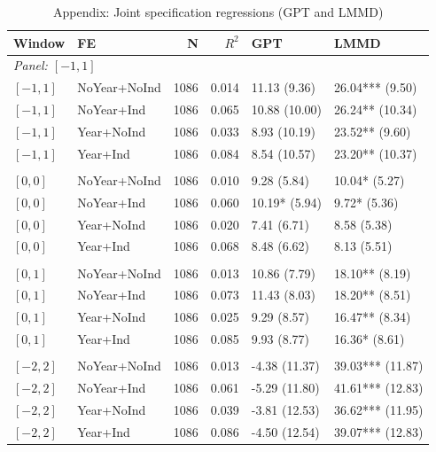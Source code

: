 \begin{table}[p]
\centering
\caption{Appendix: Joint specification regressions (GPT and LMMD)}
\label{tab:app_joint_spec}
\scriptsize
\setlength{\tabcolsep}{4pt}
\renewcommand{\arraystretch}{1.1}
\begin{tabular}{l l r r l l}
\toprule
Window & FE & N & $R^{2}$ & GPT & LMMD \\
\midrule
\multicolumn{6}{l}{\textit{Panel: $[-1,1]$}} \\
\addlinespace[1pt]
$[-1,1]$ & NoYear+NoInd & 1086 & 0.014 & 11.13 (9.36) & 26.04*** (9.50) \\
$[-1,1]$ & NoYear+Ind & 1086 & 0.065 & 10.88 (10.00) & 26.24** (10.34) \\
$[-1,1]$ & Year+NoInd & 1086 & 0.033 & 8.93 (10.19) & 23.52** (9.60) \\
$[-1,1]$ & Year+Ind & 1086 & 0.084 & 8.54 (10.57) & 23.20** (10.37) \\
\addlinespace[2pt]
\multicolumn{6}{l}{\textit{Panel: $[0,0]$}} \\
\addlinespace[1pt]
$[0,0]$ & NoYear+NoInd & 1086 & 0.010 & 9.28 (5.84) & 10.04* (5.27) \\
$[0,0]$ & NoYear+Ind & 1086 & 0.060 & 10.19* (5.94) & 9.72* (5.36) \\
$[0,0]$ & Year+NoInd & 1086 & 0.020 & 7.41 (6.71) & 8.58 (5.38) \\
$[0,0]$ & Year+Ind & 1086 & 0.068 & 8.48 (6.62) & 8.13 (5.51) \\
\addlinespace[2pt]
\multicolumn{6}{l}{\textit{Panel: $[0,1]$}} \\
\addlinespace[1pt]
$[0,1]$ & NoYear+NoInd & 1086 & 0.013 & 10.86 (7.79) & 18.10** (8.19) \\
$[0,1]$ & NoYear+Ind & 1086 & 0.073 & 11.43 (8.03) & 18.20** (8.51) \\
$[0,1]$ & Year+NoInd & 1086 & 0.025 & 9.29 (8.57) & 16.47** (8.34) \\
$[0,1]$ & Year+Ind & 1086 & 0.085 & 9.93 (8.77) & 16.36* (8.61) \\
\addlinespace[2pt]
\multicolumn{6}{l}{\textit{Panel: $[-2,2]$}} \\
\addlinespace[1pt]
$[-2,2]$ & NoYear+NoInd & 1086 & 0.013 & -4.38 (11.37) & 39.03*** (11.87) \\
$[-2,2]$ & NoYear+Ind & 1086 & 0.061 & -5.29 (11.80) & 41.61*** (12.83) \\
$[-2,2]$ & Year+NoInd & 1086 & 0.039 & -3.81 (12.53) & 36.62*** (11.95) \\
$[-2,2]$ & Year+Ind & 1086 & 0.086 & -4.50 (12.54) & 39.07*** (12.83) \\

\end{tabular}
\end{table}
